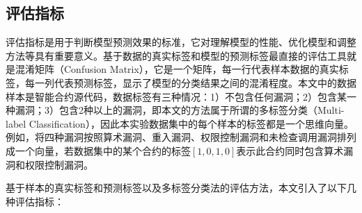\subsection{评估指标}
\label{sec:评估指标}
评估指标是用于判断模型预测效果的标准，它对理解模型的性能、优化模型和调整方法等具有重要意义。基于数据的真实标签和模型的预测标签最直接的评估工具就是混淆矩阵（Confusion Matrix），它是一个矩阵，每一行代表样本数据的真实标签，每一列代表预测标签，显示了模型的分类结果之间的混淆程度。本文中的数据样本是智能合约源代码，数据标签有三种情况：1）不包含任何漏洞；2）包含某一种漏洞；3）包含2种以上的漏洞，即本文的方法属于所谓的多标签分类（Multi-label Classification），因此本实验数据集中的每个样本的标签都是一个思维向量。例如，将四种漏洞按照算术漏洞、重入漏洞、权限控制漏洞和未检查调用漏洞排列成一个向量，若数据集中的某个合约的标签$[ 1, 0, 1, 0 ]$表示此合约同时包含算术漏洞和权限控制漏洞。

基于样本的真实标签和预测标签以及多标签分类法的评估方法，本文引入了以下几种评估指标：

